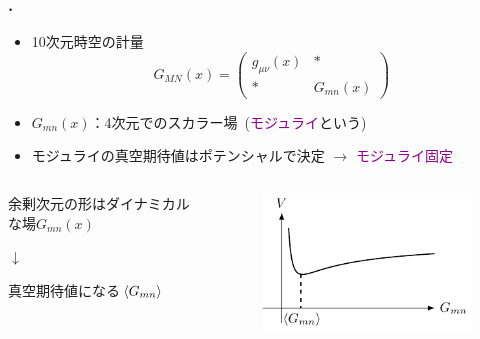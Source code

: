 \documentclass[
  a4paper,uplatex,dvipdfmx,11pt,
  xcolor = {dvipsnames,svgnames},
  hyperref ={colorlinks=true,citecolor=Navy,linkcolor=NavyBlue,urlcolor=purple}
]{beamer}
\begin{document}
\begin{frame}
  \frametitle{\thesubsection.\ \subsecname} 

  \vspace*{-10pt}
    
  \begin{itemize}
    \item 
    10次元時空の計量
    \begin{equation}
      G_{MN}(x)
      =
      \begin{pmatrix}
        g_{\mu\nu}(x) & * \\
        * & G_{mn}(x)
      \end{pmatrix}
      \nonumber
    \end{equation}
    \item 
    $G_{mn}(x)$：4次元でのスカラー場\ (\textcolor{DarkMagenta}{モジュライ}という)
    \item 
    モジュライの真空期待値はポテンシャルで決定
    $\longrightarrow$
    \textcolor{DarkMagenta}{モジュライ固定}
  \end{itemize}

  \vspace*{-30pt}

  \begin{columns}[t]    
    \begin{column}{0.49\textwidth} 
      \begin{center}
        余剰次元の形はダイナミカルな場$G_{mn}(x)$

        \vspace{5pt}

        $\downarrow$

        \vspace{5pt}

        真空期待値になる$\ev*{G_{mn}}$
      \end{center}
    \end{column}
    \begin{column}{0.4\textwidth}  
      \begin{figure}[ht]
        \centering
        \includegraphics[keepaspectratio,width=0.8\linewidth]{fig/intro_potential/intro_potential.pdf}         
      \end{figure}
    \end{column}
  \end{columns}

\end{frame}
\end{document}
